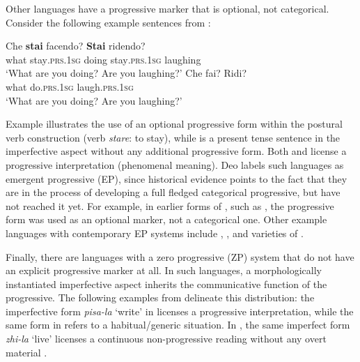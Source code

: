 \documentclass[output=paper,hidelinks]{langscibook}
\begin{document}
Other languages have a progressive marker that is optional, not categorical. Consider the following example sentences from  \citep{williams_2002}:

\ea\label{ex-ital1}
\gll Che \textbf{stai} facendo? \textbf{Stai} ridendo? \\
what stay\textsc{.prs.1sg} doing stay\textsc{.prs.1sg} laughing\\
\glt `What are you doing? Are you laughing?'
\ex\label{ex-ital2}
\gll Che fai? Ridi?\\
what do\textsc{.prs.1sg} laugh\textsc{.prs.1sg}\\
\glt `What are you doing? Are you laughing?'
\z

Example   illustrates the use of an optional progressive form within the postural verb construction (verb  \emph{stare}: to stay), while  is a present tense sentence in the imperfective aspect without any additional progressive form. Both  and   license a progressive interpretation (phenomenal meaning).  
Deo labels such languages as emergent progressive (EP), since historical evidence points to the fact that they are in the process of developing a full fledged categorical progressive, but have not reached it yet. For example, in earlier forms of , such as , the progressive form was used as an optional marker, not a categorical one. Other example languages with contemporary EP systems include , , and varieties of .

\begin{sloppypar}
Finally, there are languages with a zero progressive (ZP) system that do not have an explicit progressive marker at all. In such languages, a morphologically instantiated imperfective aspect inherits the communicative function of the progressive. The following examples from  delineate this distribution: the imperfective form \emph{pisa-la} `write' in  licenses a progressive interpretation, while the same form in  refers to a habitual/generic situation. In , the same imperfect form  \emph{zhi-la} `live' licenses a continuous non-progressive reading without any overt material \citep{comrie_76}.
\end{sloppypar}
\end{document}

